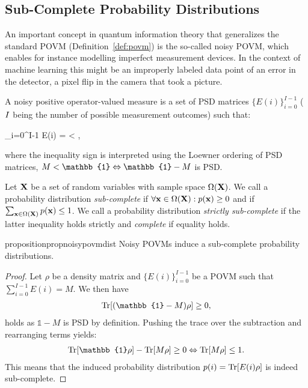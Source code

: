 \subsection{Sub-Complete Probability Distributions}

An important concept in quantum information theory that generalizes the standard POVM (\cf Definition~\ref{def:povm}) is the so-called noisy POVM, which enables for instance modelling imperfect measurement devices. In the context of machine learning this might be an improperly labeled data point of an error in the detector, \eg a pixel flip in the camera that took a picture.
\begin{definition}
	\label{def:noisypovm}
	A noisy positive operator-valued measure
	is a set of PSD  matrices $\{E(i)\}_{i=0}^{I-1}$ ($I$ being the number of possible measurement outcomes) such that:
	\begin{talign}
		\sum_{i=0}^{I-1} E(i) = \subcompletemeasrure < ,
	\end{talign}
	where the inequality sign is interpreted using the Loewner ordering of PSD matrices,
	\ie $\subcompletemeasrure < \mathbb{1} \Leftrightarrow\mathbb{1}-\subcompletemeasrure$ is PSD.
\end{definition}

\begin{definition}
	Let $\mathbf{X}$ be a set of random variables with sample space $\Omega(\mathbf{X})$. We call a probability distribution \textit{sub-complete} if $\forall \mathbf{x} \in \Omega(\mathbf{X}): p(\mathbf{x})\geq 0$ and if $\sum_{\mathbf{x} \in \Omega(\mathbf{X})} p(\mathbf{x})\leq 1$. We call a probability distribution \textit{strictly sub-complete} if the latter inequality holds strictly and \textit{complete} if equality holds.
\end{definition}




\begin{restatable}{proposition}{propnoisypovmdist}
	\label{prop:noisypovmdist}
	Noisy POVMs induce a sub-complete probability distributions.
\end{restatable}

\begin{proof}
	Let $\rho$ be a density matrix and $\{E(i)\}_{i=0}^{I-1} $ be a POVM such that $\sum_{i=0}^{I-1} E(i)=M$. We then have
	\begin{align}
		\Tr[(\mathbb{1}-M) \rho]\geq 0,
	\end{align}
	holds as $\mathbb{1}-M$ is PSD by definition.
	Pushing the trace over the subtraction and rearranging terms yields:
	\begin{align}
		\Tr[\mathbb{1} \rho]- 	\Tr[M \rho]\geq 0 \Leftrightarrow \Tr[M \rho]\leq 1.
	\end{align}
	This means that the induced probability distribution $p(i)= \Tr[E(i)\rho]$ is indeed sub-complete.
\end{proof}







